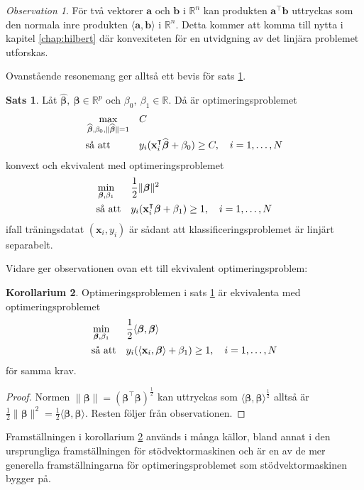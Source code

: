 \documentclass[a4paper, 12pt]{report}
\theoremstyle{definition}
\newtheorem{thm}{Sats}[section]
\newtheorem{cor}[thm]{Korollarium}
\theoremstyle{remark}
\newtheorem*{rem}{Observation}
\newcommand{\bfbeta}{{\boldsymbol{\beta}}}
\begin{document}
\begin{rem}
	För två vektorer $\mathbf{a}$ och $\mathbf{b}$ i $\mathbb{R}^n$ kan produkten $\mathbf{a}^\intercal\mathbf{b}$ uttryckas som den normala inre produkten $\langle \mathbf{a}, \mathbf{b} \rangle$ i $\mathbb{R}^n$. Detta kommer att komma till nytta i kapitel \ref{chap:hilbert} där konvexiteten för en utvidgning av det linjära problemet utforskas.
\end{rem}

Ovanstående resonemang ger alltså ett bevis för sats \ref{thm:primallinearproblem}.
\begin{thm}\label{thm:primallinearproblem}
	Låt $\widehat{\bfbeta},~\bfbeta \in \mathbb{R}^p$ och $\beta_0,~\beta_1 \in \mathbb{R}$. Då är optimeringsproblemet
	\begin{equation*}
	\begin{aligned}
	& \operatornamewithlimits{max}_{\widehat{\bfbeta},\beta_0,\|\widehat{\bfbeta}\|=1} & & C\\
	& \text{så att} & & y_i(\mathbf{x}_i^\intercal\widehat{\bfbeta}+\beta_0)\geq C,\quad i=1,\dots,N
	\end{aligned}
	\end{equation*}
	konvext och ekvivalent med optimeringsproblemet
	\begin{equation*}
	\begin{aligned}
	& \operatornamewithlimits{min}_{\bfbeta,\beta_1} & & \frac{1}{2}\|\bfbeta\|^2\\
	& \text{så att} & & y_i(\mathbf{x}_i^\intercal\bfbeta+\beta_1)\geq 1,\quad i=1,\dots,N
	\end{aligned}
	\end{equation*}
	ifall träningsdatat $(\mathbf{x}_i,y_i)$ är sådant att klassificeringsproblemet är linjärt separabelt.
\end{thm}
Vidare ger observationen ovan ett till ekvivalent optimeringsproblem:
\begin{cor}\label{cor:inreproduktoptimering}
	Optimeringsproblemen i sats \ref{thm:primallinearproblem} är ekvivalenta med optimeringsproblemet
	\begin{equation*}
	\begin{aligned}
	& \operatornamewithlimits{min}_{\bfbeta,\beta_1} & & \frac{1}{2}\langle \bfbeta, \bfbeta \rangle\\
	& \text{så att} & & y_i(\langle \mathbf{x}_i,\bfbeta\rangle+\beta_1)\geq 1,\quad i=1,\dots,N
	\end{aligned}
	\end{equation*}
	för samma krav.
\end{cor}
\begin{proof}
	Normen $\|\bfbeta\|=(\bfbeta^\intercal\bfbeta)^{\frac{1}{2}}$ kan uttryckas som $\langle \bfbeta, \bfbeta \rangle^{\frac{1}{2}}$ alltså är $\frac{1}{2} \|\bfbeta\|^2=\frac{1}{2}\langle \bfbeta, \bfbeta \rangle$. Resten följer från observationen.
\end{proof}
Framställningen i korollarium \ref{cor:inreproduktoptimering} används i många källor, bland annat i den ursprungliga framställningen för stödvektormaskinen %
och är en av de mer generella framställningarna för optimeringsproblemet som stödvektormaskinen bygger på. %
\end{document}
